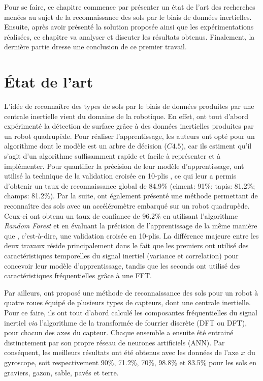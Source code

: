 Pour se faire, ce chapitre commence par présenter un état de l'art des recherches menées au sujet de la reconnaissance des sols par le biais de données inertielles. Ensuite, après avoir présenté la solution proposée ainsi que les expérimentations réalisées, ce chapitre va analyser et discuter les résultats obtenus. Finalement, la dernière partie dresse une conclusion de ce premier travail.

\section{État de l'art}

L'idée de reconnaître des types de sols par le biais de données produites par une centrale inertielle vient du domaine de la robotique. En effet, \cite{Vail2004} ont tout d'abord expérimenté la détection de surface grâce à des données inertielles produites par un robot quadrupède. Pour réaliser l'apprentissage, les auteurs ont opté pour un algorithme dont le modèle est un arbre de décision ($C4.5$), car ils estiment qu'il s'agit d'un algorithme suffisamment rapide et facile à représenter et à implémenter. Pour quantifier la précision de leur modèle d'apprentissage, \citeauthor{Vail2004} ont utilisé la technique de la validation croisée en 10-plis \citep{Kohavi1995}, ce qui leur a permis d'obtenir un taux de reconnaissance global de 84.9\% (ciment: 91\%; tapis: 81.2\%; champs: 81.2\%). Par la suite, \cite{Kertesz2016} ont également présenté une méthode permettant de reconnaître des sols avec un accéléromètre embarqué sur un robot quadrupède. Ceux-ci ont obtenu un taux de confiance de 96.2\% en utilisant l'algorithme \textit{Random Forest} et en évaluant la précision de l'apprentissage de la même manière que \citeauthor{Vail2004}, c'est-à-dire, une validation croisée en 10-plis. La différence majeure entre les deux travaux réside principalement dans le fait que les premiers ont utilisé des caractéristiques temporelles du signal inertiel (variance et correlation) pour concevoir leur modèle d'apprentissage, tandis que les seconds ont utilisé des caractéristiques fréquentielles grâce à une \acs{FFT}.

Par ailleurs, \cite{Bibuli2007} ont proposé une méthode de reconnaissance des sols pour un robot à quatre roues équipé de plusieurs types de capteurs, dont une centrale inertielle. Pour ce faire, ils ont tout d'abord calculé les composantes fréquentielles du signal inertiel \textit{via} l'algorithme de la transformée de fourrier discrète (\acl{DFT} ou \acs{DFT}), pour chacun des axes du capteur. Chaque ensemble a ensuite été entrainé distinctement par son propre réseau de neurones artificiels (\acs{ANN}). Par conséquent, les meilleurs résultats ont été obtenus avec les données de l'axe $x$ du gyroscope, soit respectivement 90\%, 71.2\%, 70\%, 98.8\% et 83.5\% pour les sols en graviers, gazon, sable, pavés et terre. 

